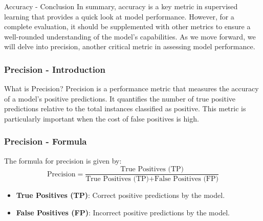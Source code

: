 \documentclass[aspectratio=169]{beamer}
\begin{document}
\begin{frame}[fragile]{Accuracy - Conclusion}
    In summary, accuracy is a key metric in supervised learning that provides a quick look at model performance. However, for a complete evaluation, it should be supplemented with other metrics to ensure a well-rounded understanding of the model's capabilities. As we move forward, we will delve into precision, another critical metric in assessing model performance.
\end{frame}

\begin{frame}[fragile]
    \frametitle{Precision - Introduction}
    \begin{block}{What is Precision?}
        Precision is a performance metric that measures the accuracy of a model’s positive predictions. It quantifies the number of true positive predictions relative to the total instances classified as positive. This metric is particularly important when the cost of false positives is high.
    \end{block}
\end{frame}

\begin{frame}[fragile]
    \frametitle{Precision - Formula}
    The formula for precision is given by:
    \begin{equation}
        \text{Precision} = \frac{\text{True Positives (TP)}}{\text{True Positives (TP)} + \text{False Positives (FP)}}
    \end{equation}
    \begin{itemize}
        \item \textbf{True Positives (TP)}: Correct positive predictions by the model.
        \item \textbf{False Positives (FP)}: Incorrect positive predictions by the model.
    \end{itemize}
\end{frame}
\end{document}
